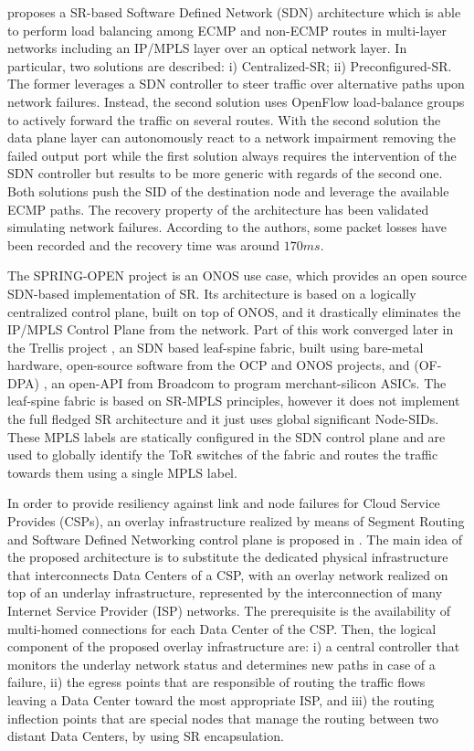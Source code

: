 \cite{castoldi2017segment} proposes a SR-based Software Defined Network (SDN) architecture which is able to perform load balancing among ECMP and non-ECMP routes in multi-layer networks including an IP/MPLS layer over an optical network layer. In particular, two solutions are described: i) Centralized-SR; ii) Preconfigured-SR. The former leverages a SDN controller to steer traffic over alternative paths upon network failures. Instead, the second solution uses OpenFlow load-balance groups to actively forward the traffic on several routes. With the second solution the data plane layer can autonomously react to a network impairment removing the failed output port while the first solution always requires the intervention of the SDN controller but results to be more generic with regards of the second one. Both solutions push the SID of the destination node and leverage the available ECMP paths. The recovery property of the architecture has been validated simulating network failures. According to the authors, some packet losses have been recorded and the recovery time was around $170ms$.

The SPRING-OPEN project \cite{springopen} is an ONOS \cite{onos} use case, which provides an open source SDN-based implementation of SR. Its architecture is based on a logically centralized control plane, built on top of ONOS, and it drastically eliminates the IP/MPLS Control Plane from the network. Part of this work converged later in the Trellis project \cite{trellis}, an SDN based leaf-spine fabric, built using bare-metal hardware, open-source software from the OCP \cite{ocp} and ONOS projects, and  (OF-DPA)  \cite{ofdpa}, an open-API from Broadcom \cite{brcm} to program merchant-silicon ASICs. The leaf-spine fabric is based on SR-MPLS principles, however it does not implement the full fledged SR architecture and it just uses global significant Node-SIDs. These MPLS labels are statically configured in the SDN control plane and are used to globally identify the ToR switches of the fabric and routes the traffic towards them using a single MPLS label.

In order to provide resiliency against link and node failures for Cloud Service Provides (CSPs), an overlay infrastructure realized by means of Segment Routing and Software Defined Networking control plane is proposed in \cite{fressancourt2015sdn}.
The main idea of the proposed architecture is to substitute the dedicated physical infrastructure that interconnects Data Centers of a CSP, with an overlay network realized on top of an underlay infrastructure, represented by the interconnection of many Internet Service Provider (ISP) networks.
The prerequisite is the availability of multi-homed connections for each Data Center of the CSP.
Then, the logical component of the proposed overlay infrastructure are: i) a central controller that monitors the underlay network status and determines new paths in case of a failure, ii) the egress points that are responsible of routing the traffic flows leaving a Data Center toward the most appropriate ISP, and iii) the routing inflection points that are special nodes that manage the routing between two distant Data Centers, by using SR encapsulation.

